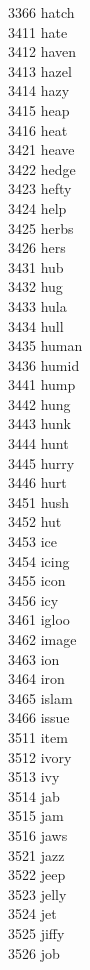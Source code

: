 3366 hatch \\
3411 hate \\
3412 haven \\
3413 hazel \\
3414 hazy \\
3415 heap \\
3416 heat \\
3421 heave \\
3422 hedge \\
3423 hefty \\
3424 help \\
3425 herbs \\
3426 hers \\
3431 hub \\
3432 hug \\
3433 hula \\
3434 hull \\
3435 human \\
3436 humid \\
3441 hump \\
3442 hung \\
3443 hunk \\
3444 hunt \\
3445 hurry \\
3446 hurt \\
3451 hush \\
3452 hut \\
3453 ice \\
3454 icing \\
3455 icon \\
3456 icy \\
3461 igloo \\
3462 image \\
3463 ion \\
3464 iron \\
3465 islam \\
3466 issue \\
3511 item \\
3512 ivory \\
3513 ivy \\
3514 jab \\
3515 jam \\
3516 jaws \\
3521 jazz \\
3522 jeep \\
3523 jelly \\
3524 jet \\
3525 jiffy \\
3526 job \\
